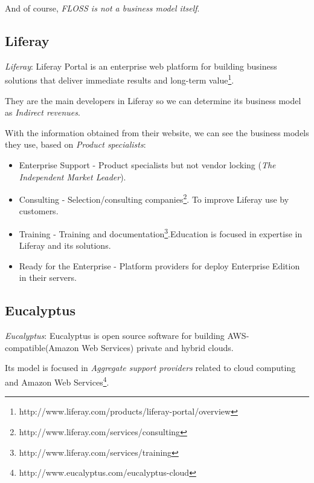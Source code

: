 \documentclass[11pt]{scrartcl}
\begin{document}
\par And of course, \emph{FLOSS is not a business model itself}.

\subsection{Liferay}

\emph{Liferay}: Liferay Portal is an enterprise web platform for building business solutions that deliver immediate results and long-term value\footnote{http://www.liferay.com/products/liferay-portal/overview}.

\par They are the main developers in Liferay so we can determine its business model as \emph{Indirect revenues}.

\par With the information obtained from their website, we can see the business models they use, based on \emph{Product specialists}:

\begin{itemize}
	\item Enterprise Support - Product specialists but not vendor locking (\emph{The Independent Market Leader}).
	\item Consulting - Selection/consulting companies\footnote{http://www.liferay.com/services/consulting}. To improve Liferay use by customers.
	\item Training - Training and documentation\footnote{http://www.liferay.com/services/training}.Education is focused in expertise in Liferay and its solutions.
	\item Ready for the Enterprise - Platform providers for deploy Enterprise Edition in their servers.
\end{itemize}

\subsection{Eucalyptus}

\emph{Eucalyptus}: Eucalyptus is open source software for building AWS-compatible(Amazon Web Services) private and hybrid clouds.

\par Its model is focused in \emph{Aggregate support providers} related to cloud computing and Amazon Web Services\footnote{http://www.eucalyptus.com/eucalyptus-cloud}.
\end{document}
